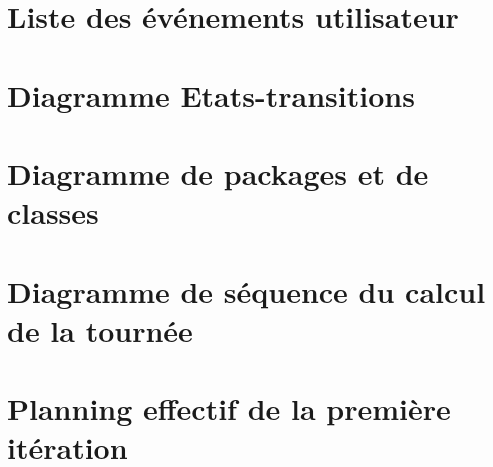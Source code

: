 \documentclass[a4paper,10pt]{article}
\begin{document}
\section{Liste des événements utilisateur}

\section{Diagramme Etats-transitions}

\section{Diagramme de packages et de classes}

\section{Diagramme de séquence du calcul de la tournée}

\section{Planning effectif de la première itération}
\end{document}
